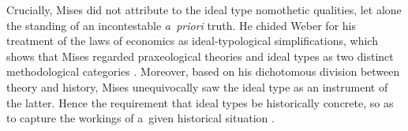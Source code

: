 Crucially, Mises did not attribute to the ideal type nomothetic qualities, let alone the standing of an incontestable \textit{a~priori} truth. He chided Weber for his treatment of the laws of economics as ideal-typological simplifications, which shows that Mises regarded praxeological theories and ideal types as two distinct methodological categories 
\parencite[][pp.79–98]{mises_epistemological_2003}. %
 Moreover, based on his dichotomous division between theory and history, Mises unequivocally saw the ideal type as an instrument of the latter. Hence the requirement that ideal types be historically concrete, so as to capture the workings of a~given historical situation 
\parencite[][p.62]{mises_human_1998}.%




